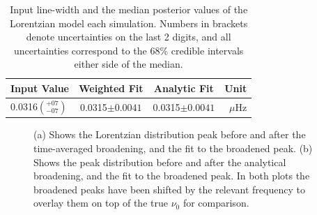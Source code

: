 \begin{table}[!ht]
	\begin{center}
		\caption{Input line-width and the median posterior values of the Lorentzian model each simulation. Numbers in brackets denote uncertainties on the last 2 digits, and all uncertainties correspond to the 68\% credible intervals either side of the median.}
		\label{tab:shift_params}
		\begin{tabular}{l c c r}
			\hline
			{\bf Input Value} & {\bf Weighted Fit} & {\bf Analytic Fit} & {\bf Unit} \\
			\hline
			
			
			{0.0316$\left(_{-07}^{+07}\right)$} & {0.0315$\pm 0.0041$} & {0.0315$\pm 0.0041$} & {$\mu\mathrm{Hz} $} \\
			
			
			\hline
		\end{tabular}
	\end{center}
\end{table}


\begin{figure}[ht!]
	\centering
	\qquad
	\caption{(a) Shows the Lorentzian distribution peak before and after the time-averaged broadening, and the fit to the broadened peak. (b) Shows the peak distribution before and after the analytical broadening, and the fit to the broadened peak. In both plots the broadened peaks have been shifted by the relevant frequency to overlay them on top of the true $\nu_0$ for comparison.} \label{fig:shifted_peaks}
\end{figure}


